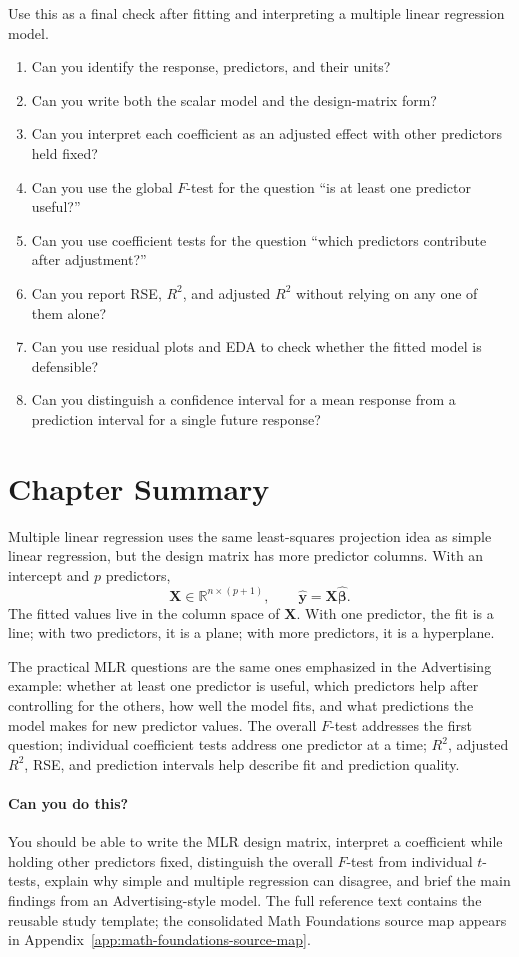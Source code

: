 {Use this as a final check after fitting and interpreting a multiple linear regression model.

\begin{enumerate}
  \item Can you identify the response, predictors, and their units?
  \item Can you write both the scalar model and the design-matrix form?
  \item Can you interpret each coefficient as an adjusted effect with other predictors held fixed?
  \item Can you use the global \(F\)-test for the question ``is at least one predictor useful?''
  \item Can you use coefficient tests for the question ``which predictors contribute after adjustment?''
  \item Can you report RSE, \(R^2\), and adjusted \(R^2\) without relying on any one of them alone?
  \item Can you use residual plots and EDA to check whether the fitted model is defensible?
  \item Can you distinguish a confidence interval for a mean response from a prediction interval for a single future response?
\end{enumerate}
}{
\section{Chapter Summary}

Multiple linear regression uses the same least-squares projection idea as simple linear regression, but the design matrix has more predictor columns.  With an intercept and \(p\) predictors,
\begin{equation}
  \mathbf{X}\in\mathbb{R}^{n\times(p+1)},
  \qquad
  \widehat{\mathbf{y}}=\mathbf{X}\widehat{\boldsymbol{\beta}}.
\end{equation}
The fitted values live in the column space of \(\mathbf{X}\).  With one predictor, the fit is a line; with two predictors, it is a plane; with more predictors, it is a hyperplane.

The practical MLR questions are the same ones emphasized in the Advertising example: whether at least one predictor is useful, which predictors help after controlling for the others, how well the model fits, and what predictions the model makes for new predictor values.  The overall \(F\)-test addresses the first question; individual coefficient tests address one predictor at a time; \(R^2\), adjusted \(R^2\), RSE, and prediction intervals help describe fit and prediction quality.

\paragraph{Can you do this?}
You should be able to write the MLR design matrix, interpret a coefficient while holding other predictors fixed, distinguish the overall \(F\)-test from individual \(t\)-tests, explain why simple and multiple regression can disagree, and brief the main findings from an Advertising-style model.  The full reference text contains the reusable study template; the consolidated Math Foundations source map appears in Appendix~\ref{app:math-foundations-source-map}.
}
